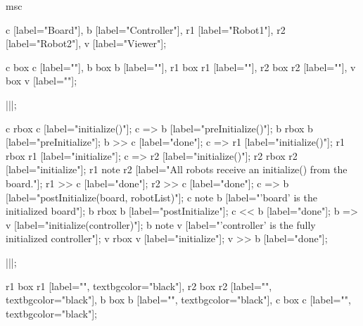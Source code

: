 \begin{msc}
msc
{

c [label="Board"],
b [label="Controller"],
r1 [label="Robot1"],
r2 [label="Robot2"],
v [label="Viewer"];

c box c [label=""],
b box b [label=""],
r1 box r1 [label=""],
r2 box r2 [label=""],
v box v [label=""];

|||;

c rbox c [label="initialize()"];
c => b [label="preInitialize()"];
b rbox b [label="preInitialize"];
b >> c [label="done"];
c => r1 [label="initialize()"];
r1 rbox r1 [label="initialize"];
c => r2 [label="initialize()"];
r2 rbox r2 [label="initialize"];
r1 note r2 [label="All robots receive an initialize() from the board."];
r1 >> c [label="done"];
r2 >> c [label="done"];
c => b [label="postInitialize(board, robotList)"];
c note b [label="'board' is the initialized board"];
b rbox b [label="postInitialize"];
c << b [label="done"];
b => v [label="initialize(controller)"];
b note v [label="'controller' is the fully initialized controller"];
v rbox v [label="initialize"];
v >> b [label="done"];

|||;

r1 box r1 [label="", textbgcolor="black"],
r2 box r2 [label="", textbgcolor="black"],
b box b [label="", textbgcolor="black"],
c box c [label="", textbgcolor="black"];

}
\end{msc}
